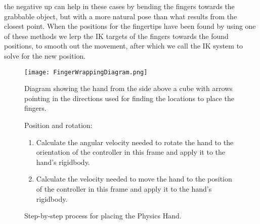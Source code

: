 the negative up can help in these cases by bending the fingers towards the grabbable object, but with a more natural pose than what results from the closest point. When the positions for the fingertips have been found by using one of these methods we lerp the IK targets of the fingers towards the found positions, to smooth out the movement, after which we call the IK system to solve for the new position.

\begin{figure}[h]
\centering
\texttt{[image: FingerWrappingDiagram.png]}
\caption{Diagram showing the hand from the side above a cube with arrows pointing in the directions used for finding the locations to place the fingers.}
\label{fig:physicsHandFingerPlacementDiagram}
\end{figure}

\begin{figure}[H]
\centering
\footnotesize
\begin{flushleft}
Position and rotation:
\end{flushleft}
\begin{enumerate}[noitemsep]
\item Calculate the angular velocity needed to rotate the hand to the orientation of the controller in this frame and apply it to the hand's rigidbody.
\item Calculate the velocity needed to move the hand to the position of the controller in this frame and apply it to the hand's rigidbody.
\end{enumerate}
\caption{Step-by-step process for placing the Physics Hand.}
\label{fig:stepByStepPhysicsHandPositionRotation}
\end{figure}

